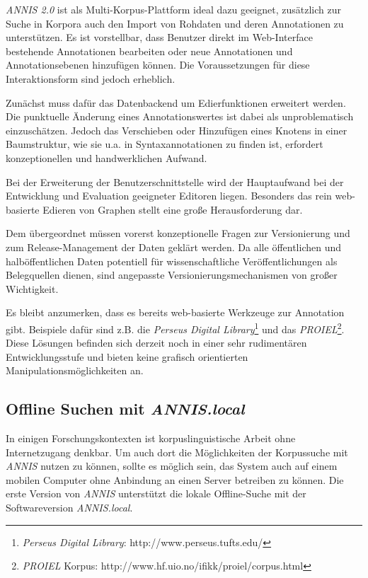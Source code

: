 \emph{ANNIS 2.0} ist als Multi-Korpus-Plattform ideal dazu geeignet, zusätzlich zur Suche in Korpora auch den Import von Rohdaten und deren Annotationen zu unterstützen. Es ist vorstellbar, dass Benutzer direkt im Web-Interface bestehende Annotationen bearbeiten oder neue Annotationen und Annotationsebenen hinzufügen können. Die Voraussetzungen für diese Interaktionsform sind jedoch erheblich.

Zunächst muss dafür das Datenbackend um Edierfunktionen erweitert werden. Die punktuelle Änderung eines Annotationswertes ist dabei als unproblematisch einzuschätzen. Jedoch das Verschieben oder Hinzufügen eines Knotens in einer Baumstruktur, wie sie u.a. in Syntaxannotationen zu finden ist, erfordert konzeptionellen und handwerklichen Aufwand.

Bei der Erweiterung der Benutzerschnittstelle wird der Hauptaufwand bei der Entwicklung und Evaluation geeigneter Editoren liegen. Besonders das rein web-basierte Edieren von Graphen stellt eine große Herausforderung dar.

Dem übergeordnet müssen vorerst konzeptionelle Fragen zur Versionierung und zum Release-Management der Daten geklärt werden. Da alle öffentlichen und halböffentlichen Daten potentiell für wissenschaftliche Veröffentlichungen als Belegquellen dienen, sind angepasste Versionierungsmechanismen von großer Wichtigkeit.

Es bleibt anzumerken, dass es bereits web-basierte Werkzeuge zur Annotation gibt. Beispiele dafür sind z.B. die \emph{Perseus Digital Library}\footnote{\emph{Perseus Digital Library}: http://www.perseus.tufts.edu/} und das \emph{PROIEL}\footnote{\emph{PROIEL} Korpus: http://www.hf.uio.no/ifikk/proiel/corpus.html}. Diese Lösungen befinden sich derzeit noch in einer sehr rudimentären Entwicklungsstufe und bieten keine grafisch orientierten Manipulationsmöglichkeiten an.

\subsection{Offline Suchen mit \emph{ANNIS.local}}\label{sec:ANNIS.local}

In einigen Forschungskontexten ist korpuslinguistische Arbeit ohne Internetzugang denkbar. Um auch dort die Möglichkeiten der Korpussuche mit \emph{ANNIS} nutzen zu können, sollte es möglich sein, das System auch auf einem mobilen Computer ohne Anbindung an einen Server betreiben zu können. Die erste Version von \emph{ANNIS} unterstützt die lokale Offline-Suche mit der Softwareversion \emph{ANNIS.local}.

